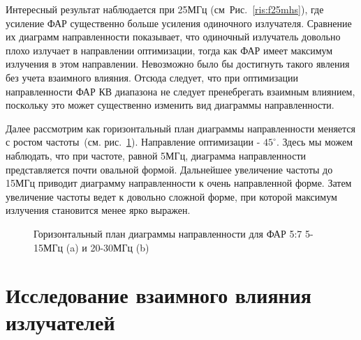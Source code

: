 Интересный результат наблюдается при 25МГц (см~Рис.~\ref{ris:f25mhs}), где усиление ФАР существенно больше усиления одиночного излучателя. Сравнение их диаграмм направленности показывает, что одиночный излучатель довольно плохо излучает в направлении оптимизации, тогда как ФАР имеет максимум излучения в этом направлении. Невозможно было бы достигнуть такого явления без учета взаимного влияния. Отсюда следует, что при оптимизации направленности ФАР КВ диапазона не следует пренебрегать взаимным влиянием, поскольку это может существенно изменить вид диаграммы направленности.

Далее рассмотрим как горизонтальный план диаграммы направленности меняется с ростом частоты~(см. рис.~\ref{ris:horizontal}). Направление оптимизации - $45^{\circ}$. Здесь мы можем наблюдать, что при частоте, равной 5МГц, диаграмма направленности представляется почти овальной формой. Дальнейшее увеличение частоты до 15МГц приводит диаграмму направленности к очень направленной форме. Затем увеличение частоты ведет к довольно сложной форме, при которой максимум излучения становится менее ярко выражен.

\begin{figure}
\begin{minipage}[h]{0.49\linewidth}
\end{minipage}
\hfill
\begin{minipage}[h]{0.49\linewidth}
\end{minipage}
\caption{Горизонтальный план диаграммы направленности для ФАР 5:7 5-15МГц (a) и 20-30МГц (b)}
\label{ris:horizontal}
\end{figure}

\section{Исследование взаимного влияния излучателей}

